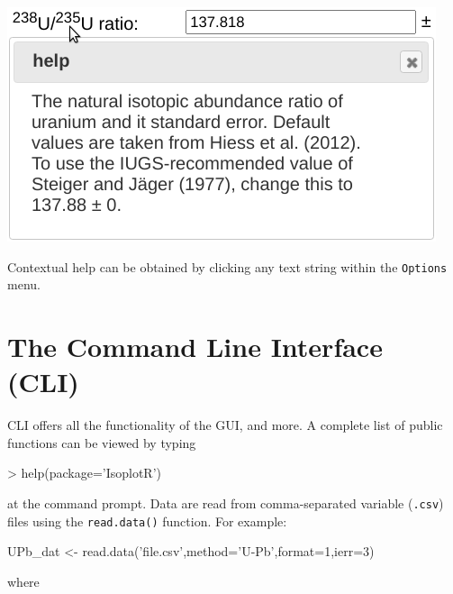 \begin{refsection}
\noindent\begin{minipage}[t]{.45\textwidth}
\strut\vspace*{-\baselineskip}\newline
\includegraphics[width=\textwidth]{../figures/contextualhelp.png}
\end{minipage}
\begin{minipage}[t]{.55\textwidth}
Contextual help can be obtained by clicking any text string within the
\texttt{Options} menu.
\end{minipage}

\section{The Command Line Interface (CLI)}\label{sec:CLI}

CLI offers all the functionality of the GUI, and more. A complete list
of public functions can be viewed by typing

\begin{console}
> help(package='IsoplotR')
\end{console}

\noindent at the command prompt. Data are read from comma-separated
variable (\texttt{.csv}) files using the \texttt{read.data()}
function. For example:

\begin{script}
UPb_dat <- read.data('file.csv',method='U-Pb',format=1,ierr=3)
\end{script}

\noindent where\\


\end{refsection}
